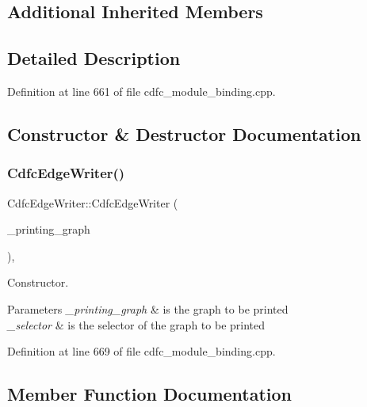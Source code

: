 \subsection*{Additional Inherited Members}


\subsection{Detailed Description}


Definition at line 661 of file cdfc\+\_\+module\+\_\+binding.\+cpp.



\subsection{Constructor \& Destructor Documentation}
\mbox{\label{classCdfcEdgeWriter_a5001706227d2cbec6aa223a4fc31dc5c}} 
\subsubsection{\texorpdfstring{Cdfc\+Edge\+Writer()}{CdfcEdgeWriter()}}
{\footnotesize\ttfamily Cdfc\+Edge\+Writer\+::\+Cdfc\+Edge\+Writer (\begin{DoxyParamCaption}\item[{const \hyperlink{classCdfcGraph}{Cdfc\+Graph} $\ast$}]{\+\_\+printing\+\_\+graph }\end{DoxyParamCaption})\hspace{0.3cm}{\ttfamily [inline]}, {\ttfamily [explicit]}}



Constructor. 


\begin{DoxyParams}{Parameters}
{\em \+\_\+printing\+\_\+graph} & is the graph to be printed \\
\hline
{\em \+\_\+selector} & is the selector of the graph to be printed \\
\hline
\end{DoxyParams}


Definition at line 669 of file cdfc\+\_\+module\+\_\+binding.\+cpp.



\subsection{Member Function Documentation}
\mbox{\label{classCdfcEdgeWriter_ad2a0011f644764bd10dc0f77da897a52}} 
